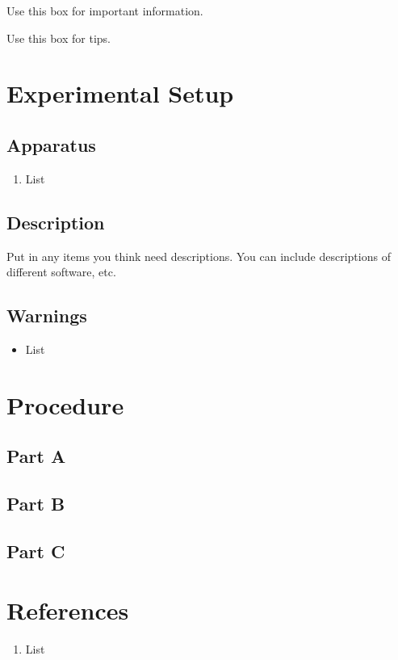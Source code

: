 \begin{imp}
Use this box for important information.
\end{imp}

\begin{tip}
Use this box for tips.
\end{tip}


 

 

 
\section*{Experimental Setup}


\subsection*{Apparatus}

\begin{enumerate}
\itemsep0em
\item List
\end{enumerate}



\subsection*{Description}

Put in any items you think need descriptions. You can include descriptions of different software, etc.

\subsection*{Warnings}
\begin{itemize}
\itemsep0em
\item List
\end{itemize}


\section*{Procedure}
\subsection*{Part A}

\subsection*{Part B}

\subsection*{Part C}



\section*{References}
\begin{enumerate}
\itemsep0em
\item List
\end{enumerate}

